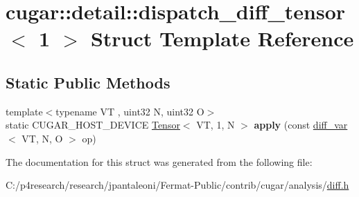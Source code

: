 \hypertarget{structcugar_1_1detail_1_1dispatch__diff__tensor_3_011_01_4}{}\section{cugar\+:\+:detail\+:\+:dispatch\+\_\+diff\+\_\+tensor$<$ 1 $>$ Struct Template Reference}
\label{structcugar_1_1detail_1_1dispatch__diff__tensor_3_011_01_4}
\subsection*{Static Public Methods}
\begin{DoxyCompactItemize}
\item 
\mbox{\label{structcugar_1_1detail_1_1dispatch__diff__tensor_3_011_01_4_aba0856e8234ab734ccee692cfc83a547}} 
{\footnotesize template$<$typename VT , uint32 N, uint32 O$>$ }\\static C\+U\+G\+A\+R\+\_\+\+H\+O\+S\+T\+\_\+\+D\+E\+V\+I\+CE \hyperlink{structcugar_1_1_tensor}{Tensor}$<$ VT, 1, N $>$ {\bfseries apply} (const \hyperlink{structcugar_1_1diff__var}{diff\+\_\+var}$<$ VT, N, O $>$ op)
\end{DoxyCompactItemize}


The documentation for this struct was generated from the following file\+:\begin{DoxyCompactItemize}
\item 
C\+:/p4research/research/jpantaleoni/\+Fermat-\/\+Public/contrib/cugar/analysis/\hyperlink{diff_8h}{diff.\+h}\end{DoxyCompactItemize}
